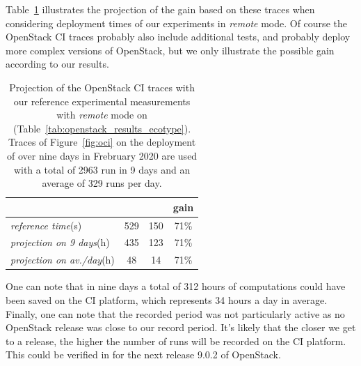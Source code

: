 Table~\ref{tab:projection} illustrates the projection of the gain based on these 
traces when considering deployment times of our experiments in \emph{remote} mode. 
Of course the OpenStack CI traces probably also include additional tests, and 
probably deploy more complex versions of OpenStack, but we only illustrate the 
possible gain according to our results. 

\begin{table}
\begin{center}
	\begin{tabular}{lccc}
		\toprule
		& \kolla & \mad & gain\\
		\midrule
		\emph{reference time}(s) & 529 & 150 & 71\%\\
		\emph{projection on 9 days}(h) & 435 & 123 & 71\%\\
		\emph{projection on av./day}(h) & 48 & 14 & 71\%\\
		\bottomrule
	\end{tabular}
	\caption{Projection of the OpenStack CI traces with our reference experimental 
			measurements with \emph{remote} mode on \ecotype 		
			(Table~\ref{tab:openstack_results_ecotype}). Traces of 			
			Figure~\ref{fig:oci} on the deployment of \kolla over nine days in 
			Frebruary 2020 are used with a total of 2963 \kolla run in 9 days and 
			an average of 329 runs per day.}
			\label{tab:projection}
	\end{center}
\end{table}

One can note that in nine days a total of 312 hours of computations could have 
been saved on the CI platform, which represents 34 hours a day in average. 
Finally, one can note that the recorded period was not particularly active as no 
OpenStack release was close to our record period. It's likely that the closer we 
get to a release, the higher the number of \kolla runs will be recorded on the CI 
platform. This could be verified in for the next release 9.0.2 of OpenStack.




